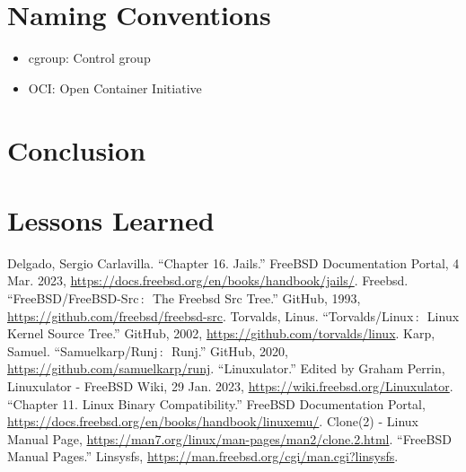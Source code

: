 \documentclass[12pt, dvipsnames, a4paper]{article}
\begin{document}
\section{Naming Conventions}
\begin{itemize}
	\item {cgroup: Control group}
	\item {OCI: Open Container Initiative}
\end{itemize}

\section{Conclusion}
\lipsum[1]

\section{Lessons Learned}
\lipsum[1]

\begin{thebibliography}{00}
	 Delgado, Sergio  Carlavilla. “Chapter 16. Jails.” FreeBSD Documentation Portal, 4 Mar. 2023, \href{https://docs.freebsd.org/en/books/handbook/jails/}{https://docs.freebsd.org/en/books/handbook/jails/}.
	 Freebsd. “FreeBSD/FreeBSD-Src$\,\colon\,$ The Freebsd Src Tree.” GitHub, 1993, \href{https://github.com/freebsd/freebsd-src}{https://github.com/freebsd/freebsd-src}.
	 Torvalds, Linus. “Torvalds/Linux$\,\colon\,$ Linux Kernel Source Tree.” GitHub, 2002, \href{https://github.com/torvalds/linux}{https://github.com/torvalds/linux}. 
	 Karp, Samuel. “Samuelkarp/Runj$\,\colon\,$ Runj.” GitHub, 2020, \href{https://github.com/samuelkarp/runj}{https://github.com/samuelkarp/runj}.
	 “Linuxulator.” Edited by Graham Perrin, Linuxulator - FreeBSD Wiki, 29 Jan. 2023, \href{https://wiki.freebsd.org/Linuxulator}{https://wiki.freebsd.org/Linuxulator}.
	 “Chapter 11. Linux Binary Compatibility.” FreeBSD Documentation Portal, \href{https://docs.freebsd.org/en/books/handbook/linuxemu/}{https://docs.freebsd.org/en/books/handbook/linuxemu/}.
	 Clone(2) - Linux Manual Page, \href{https://man7.org/linux/man-pages/man2/clone.2.html}{https://man7.org/linux/man-pages/man2/clone.2.html}.
	 “FreeBSD Manual Pages.” Linsysfs, \href{https://man.freebsd.org/cgi/man.cgi?linsysfs}{https://man.freebsd.org/cgi/man.cgi?linsysfs}.


\end{thebibliography}
\end{document}
